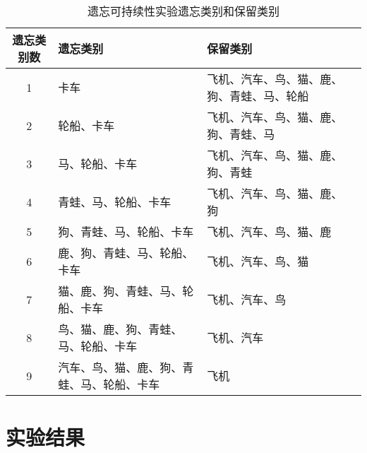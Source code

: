 
\begin{table}
    \centering
    \caption{遗忘可持续性实验遗忘类别和保留类别}
    \begin{tabular}{cp{6cm}p{6cm}p{3cm}}
      \toprule
      遗忘类别数  & 遗忘类别 & 保留类别  \\
      \midrule
      1 & 卡车  & 飞机、汽车、鸟、猫、鹿、狗、青蛙、马、轮船  \\
      2 & 轮船、卡车  & 飞机、汽车、鸟、猫、鹿、狗、青蛙、马  \\
      3 & 马、轮船、卡车  & 飞机、汽车、鸟、猫、鹿、狗、青蛙  \\
      4 & 青蛙、马、轮船、卡车  & 飞机、汽车、鸟、猫、鹿、狗  \\
      5 & 狗、青蛙、马、轮船、卡车  & 飞机、汽车、鸟、猫、鹿  \\
      6 & 鹿、狗、青蛙、马、轮船、卡车  & 飞机、汽车、鸟、猫  \\
      7 & 猫、鹿、狗、青蛙、马、轮船、卡车  & 飞机、汽车、鸟  \\
      8 & 鸟、猫、鹿、狗、青蛙、马、轮船、卡车  & 飞机、汽车  \\
      9 & 汽车、鸟、猫、鹿、狗、青蛙、马、轮船、卡车  & 飞机  \\
      \bottomrule
    \end{tabular}
    \label{tab:forget-continuous-kinds}
\end{table}

\section{实验结果}
